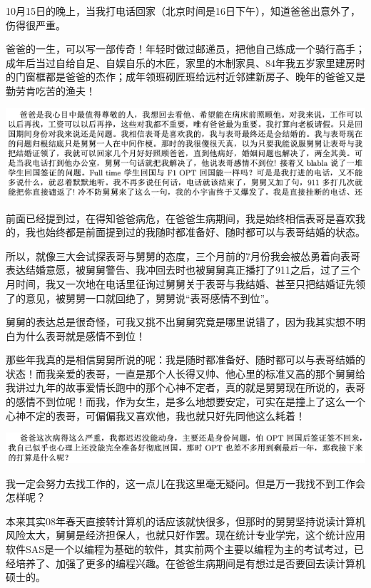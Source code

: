 \documentclass[9pt, b5paper]{article}
\begin{document}
10月15日的晚上，当我打电话回家（北京时间是16日下午），知道爸爸出意外了，伤得很严重。

爸爸的一生，可以写一部传奇！年轻时做过邮递员，把他自己练成一个骑行高手；成年后当过自给自足、自娱自乐的木匠，家里的木制家具、84年我五岁家里建房时的门窗框都是爸爸的杰作；成年领班砌匠班给远村近邻建新房子、晚年的爸爸又是勤劳肯吃苦的渔夫！  

\begin{center}
\includegraphics[width=.9\linewidth]{./pic/backups_plans_20210414_201442.png}
\end{center}

前面已经提到过，在得知爸爸病危，在爸爸生病期间，我是始终相信表哥是喜欢我的，我也始终都是前面提到过的我随时都准备好、随时都可以与表哥结婚的状态。

所以，就像三大会试探表哥与舅舅的态度，三个月前的7月份我会被怂勇着向表哥表达结婚意愿，被舅舅警告、我冲回去时也被舅舅真正播打了911之后，过了三个月时间，我又一次地在电话里征询过舅舅关于表哥与我结婚、甚至只把结婚证先领了的意见，被舅舅一口就回绝了，舅舅说“表哥感情不到位”。

舅舅的表达总是很奇怪，可我又挑不出舅舅究竟是哪里说错了，因为我其实想不明白为什么表哥就是感情不到位！

那些年我真的是相信舅舅所说的呢：我是随时都准备好、随时都可以与表哥结婚的状态！而我亲爱的表哥，一直是那个人长得又帅、他心里的标准又高的那个舅舅给我讲过九年的故事爱情长跑中的那个心神不定者，真的就是舅舅现在所说的，表哥的感情不到位呢！而我，作为女生，是多么地想要安定，可实在是撞上了这么一个心神不定的表哥，可偏偏我又喜欢他，我也就只好先同他这么耗着！

\begin{center}
\includegraphics[width=.9\linewidth]{./pic/backups_plans_20210414_160826.png}
\end{center}

我一定会努力去找工作的，这一点儿在我这里毫无疑问。但是万一我找不到工作会怎样呢？

本来其实08年春天直接转计算机的话应该就快很多，但那时的舅舅坚持说读计算机风险太大，舅舅是经济担保人，也就只好作罢。现在统计专业学完，这个统计应用软件SAS是一个以编程为基础的软件，其实前两个主要以编程为主的考试考过，已经培养了、加强了更多的编程兴趣。在爸爸生病期间是有想过是否要回去读计算机硕士的。 
\end{document}
